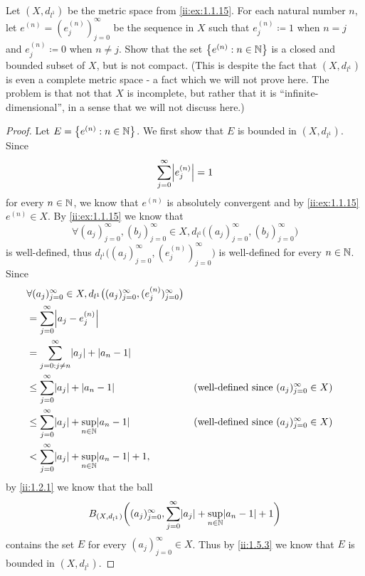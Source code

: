 \begin{ex}\label{ii:ex:1.5.8}
  Let \((X, d_{l^1})\) be the metric space from \cref{ii:ex:1.1.15}.
  For each natural number \(n\), let \(e^{(n)} = (e_j^{(n)})_{j = 0}^\infty\) be the sequence in \(X\) such that \(e_j^{(n)} \coloneqq 1\) when \(n = j\) and \(e_j^{(n)} \coloneqq 0\) when \(n \neq j\).
  Show that the set \(\left\lbrace e^{(n)} : n \in \mathbb{N}\right\rbrace\) is a closed and bounded subset of \(X\), but is not compact.
  (This is despite the fact that \((X, d_{l^1})\) is even a complete metric space
  - a fact which we will not prove here.
  The problem is that not that \(X\) is incomplete, but rather that it is ``infinite-dimensional'', in a sense that we will not discuss here.)
\end{ex}

\begin{proof}
  Let \(E = \left\lbrace e^{(n)} : n \in \mathbb{N}\right\rbrace\).
  We first show that \(E\) is bounded in \((X, d_{l^1})\).
  Since
  \[
    \sum_{j = 0}^\infty \abs{e_j^{(n)}} = 1
  \]
  for every \(n \in \mathbb{N}\), we know that \(e^{(n)}\) is absolutely convergent and by \cref{ii:ex:1.1.15} \(e^{(n)} \in X\).
  By \cref{ii:ex:1.1.15} we know that
  \[
    \forall (a_j)_{j = 0}^\infty, (b_j)_{j = 0}^\infty \in X, d_{l^1}\big((a_j)_{j = 0}^\infty, (b_j)_{j = 0}^\infty\big)
  \]
  is well-defined, thus \(d_{l^1}\big((a_j)_{j = 0}^\infty, (e_j^{(n)})_{j = 0}^\infty\big)\) is well-defined for every \(n \in \mathbb{N}\).
  Since
  \begin{align*}
     & \forall (a_j)_{j = 0}^\infty \in X, d_{l^1}\big((a_j)_{j = 0}^\infty, (e_j^{(n)})_{j = 0}^\infty\big)                                                                 \\
     & = \sum_{j = 0}^\infty \abs{a_j - e_j^{(n)}}                                                                                                                           \\
     & = \sum_{j = 0 : j \neq n}^\infty \abs{a_j} + \abs{a_n - 1}                                                                                                            \\
     & \leq \sum_{j = 0}^\infty \abs{a_j} + \abs{a_n - 1}                                                    &  & \text{(well-defined since \((a_j)_{j = 0}^\infty \in X\))} \\
     & \leq \sum_{j = 0}^\infty \abs{a_j} + \sup_{n \in \N}\abs{a_n - 1}                                     &  & \text{(well-defined since \((a_j)_{j = 0}^\infty \in X\))} \\
     & < \sum_{j = 0}^\infty \abs{a_j} + \sup_{n \in \N}\abs{a_n - 1} + 1,
  \end{align*}
  by \cref{ii:1.2.1} we know that the ball
  \[
    B_{(X, d_{l^1})}\bigg((a_j)_{j = 0}^\infty, \sum_{j = 0}^\infty \abs{a_j} + \sup_{n \in \N}\abs{a_n - 1} + 1\bigg)
  \]
  contains the set \(E\) for every \((a_j)_{j = 0}^\infty \in X\).
  Thus by \cref{ii:1.5.3} we know that \(E\) is bounded in \((X, d_{l^1})\).


\end{proof}
